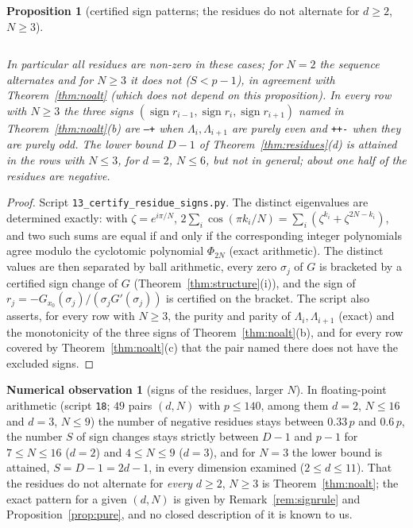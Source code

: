 \documentclass[11pt,a4paper]{article}
\theoremstyle{plain}
\newtheorem{proposition}[theorem]{Proposition}
\theoremstyle{definition}
\newtheorem{observation}[theorem]{Numerical observation}
\numberwithin{equation}{section}
\begin{document}
\begin{proposition}[certified sign patterns; the residues do not alternate for $d\ge2$, $N\ge3$]
\begin{center}
\begin{tabular}{llrrrl}
\end{tabular}
\end{center}
In particular all residues are non-zero in these cases; for $N=2$ the sequence alternates and for $N\ge3$ it does not ($S<p-1$), in agreement with Theorem~\ref{thm:noalt} (which does not depend on this proposition). In every row with $N\ge3$ the three signs $(\operatorname{sign}r_{i-1},\operatorname{sign}r_i,\operatorname{sign}r_{i+1})$ named in Theorem~\ref{thm:noalt}(b) are \texttt{--+} when $\Lambda_i,\Lambda_{i+1}$ are purely even and \texttt{++-} when they are purely odd. The lower bound $D-1$ of Theorem~\ref{thm:residues}(d) is attained in the rows with $N\le3$, for $d=2$, $N\le6$, but not in general; about one half of the residues are negative.
\end{proposition}
\begin{proof}
Script \texttt{13\_certify\_residue\_signs.py}. The distinct eigenvalues are determined exactly: with $\zeta=e^{i\pi/N}$, $2\sum_i\cos(\pi k_i/N)=\sum_i(\zeta^{k_i}+\zeta^{2N-k_i})$, and two such sums are equal if and only if the corresponding integer polynomials agree modulo the cyclotomic polynomial $\Phi_{2N}$ (exact arithmetic). The distinct values are then separated by ball arithmetic, every zero $\sigma_j$ of $G$ is bracketed by a certified sign change of $G$ (Theorem~\ref{thm:structure}(i)), and the sign of $r_j=-G_{x_0}(\sigma_j)/(\sigma_jG'(\sigma_j))$ is certified on the bracket. The script also asserts, for every row with $N\ge3$, the purity and parity of $\Lambda_i,\Lambda_{i+1}$ (exact) and the monotonicity of the three signs of Theorem~\ref{thm:noalt}(b), and for every row covered by Theorem~\ref{thm:noalt}(c) that the pair named there does not have the excluded signs.
\end{proof}

\begin{observation}[signs of the residues, larger $N$]\label{obs:signs}
In floating-point arithmetic (script \texttt{18}; $49$ pairs $(d,N)$ with $p\le140$, among them $d=2$, $N\le16$ and $d=3$, $N\le9$) the number of negative residues stays between $0.33\,p$ and $0.6\,p$, the number $S$ of sign changes stays strictly between $D-1$ and $p-1$ for $7\le N\le16$ ($d=2$) and $4\le N\le9$ ($d=3$), and for $N=3$ the lower bound is attained, $S=D-1=2d-1$, in every dimension examined ($2\le d\le11$). That the residues do not alternate for \emph{every} $d\ge2$, $N\ge3$ is Theorem~\ref{thm:noalt}; the exact pattern for a given $(d,N)$ is given by Remark~\ref{rem:signrule} and Proposition~\ref{prop:pure}, and no closed description of it is known to us.
\end{observation}
\end{document}

